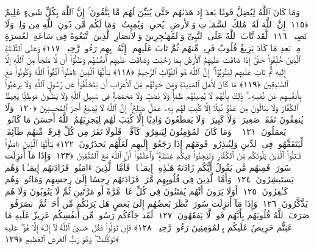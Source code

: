  وَمَا كَانَ ٱللَّهُ لِيُضِلَّ قَومًۢا بَعدَ إِذ هَدَىٰهُم حَتَّىٰ يُبَيِّنَ لَهُم مَّا يَتَّقُونَ ۚ إِنَّ ٱللَّهَ بِكُلِّ شَىءٍ عَلِيمٌ ﴿١١٥﴾
 إِنَّ ٱللَّهَ لَهُۥ مُلكُ ٱلسَّمَـٰوَٟتِ وَٱلأَرضِ ۖ يُحىِۦ وَيُمِيتُ ۚ وَمَا لَكُم مِّن دُونِ ٱللَّهِ مِن وَلِىٍّۢ وَلَا نَصِيرٍۢ ﴿١١٦﴾
 لَّقَد تَّابَ ٱللَّهُ عَلَى ٱلنَّبِىِّ وَٱلمُهَـٰجِرِينَ وَٱلأَنصَارِ ٱلَّذِينَ ٱتَّبَعُوهُ فِى سَاعَةِ ٱلعُسرَةِ مِنۢ بَعدِ مَا كَادَ يَزِيغُ قُلُوبُ فَرِيقٍۢ مِّنهُم ثُمَّ تَابَ عَلَيهِم ۚ إِنَّهُۥ بِهِم رَءُوفٌۭ رَّحِيمٌۭ ﴿١١٧﴾
 وَعَلَى ٱلثَّلَـٰثَةِ ٱلَّذِينَ خُلِّفُوا۟ حَتَّىٰٓ إِذَا ضَاقَت عَلَيهِمُ ٱلأَرضُ بِمَا رَحُبَت وَضَاقَت عَلَيهِم أَنفُسُهُم وَظَنُّوٓا۟ أَن لَّا مَلجَأَ مِنَ ٱللَّهِ إِلَّآ إِلَيهِ ثُمَّ تَابَ عَلَيهِم لِيَتُوبُوٓا۟ ۚ إِنَّ ٱللَّهَ هُوَ ٱلتَّوَّابُ ٱلرَّحِيمُ ﴿١١٨﴾
 يَـٰٓأَيُّهَا ٱلَّذِينَ ءَامَنُوا۟ ٱتَّقُوا۟ ٱللَّهَ وَكُونُوا۟ مَعَ ٱلصَّـٰدِقِينَ ﴿١١٩﴾
 مَا كَانَ لِأَهلِ ٱلمَدِينَةِ وَمَن حَولَهُم مِّنَ ٱلأَعرَابِ أَن يَتَخَلَّفُوا۟ عَن رَّسُولِ ٱللَّهِ وَلَا يَرغَبُوا۟ بِأَنفُسِهِم عَن نَّفسِهِۦ ۚ ذَٟلِكَ بِأَنَّهُم لَا يُصِيبُهُم ظَمَأٌۭ وَلَا نَصَبٌۭ وَلَا مَخمَصَةٌۭ فِى سَبِيلِ ٱللَّهِ وَلَا يَطَـُٔونَ مَوطِئًۭا يَغِيظُ ٱلكُفَّارَ وَلَا يَنَالُونَ مِن عَدُوٍّۢ نَّيلًا إِلَّا كُتِبَ لَهُم بِهِۦ عَمَلٌۭ صَـٰلِحٌ ۚ إِنَّ ٱللَّهَ لَا يُضِيعُ أَجرَ ٱلمُحسِنِينَ ﴿١٢٠﴾
 وَلَا يُنفِقُونَ نَفَقَةًۭ صَغِيرَةًۭ وَلَا كَبِيرَةًۭ وَلَا يَقطَعُونَ وَادِيًا إِلَّا كُتِبَ لَهُم لِيَجزِيَهُمُ ٱللَّهُ أَحسَنَ مَا كَانُوا۟ يَعمَلُونَ ﴿١٢١﴾
 ۞ وَمَا كَانَ ٱلمُؤمِنُونَ لِيَنفِرُوا۟ كَآفَّةًۭ ۚ فَلَولَا نَفَرَ مِن كُلِّ فِرقَةٍۢ مِّنهُم طَآئِفَةٌۭ لِّيَتَفَقَّهُوا۟ فِى ٱلدِّينِ وَلِيُنذِرُوا۟ قَومَهُم إِذَا رَجَعُوٓا۟ إِلَيهِم لَعَلَّهُم يَحذَرُونَ ﴿١٢٢﴾
 يَـٰٓأَيُّهَا ٱلَّذِينَ ءَامَنُوا۟ قَـٰتِلُوا۟ ٱلَّذِينَ يَلُونَكُم مِّنَ ٱلكُفَّارِ وَليَجِدُوا۟ فِيكُم غِلظَةًۭ ۚ وَٱعلَمُوٓا۟ أَنَّ ٱللَّهَ مَعَ ٱلمُتَّقِينَ ﴿١٢٣﴾
 وَإِذَا مَآ أُنزِلَت سُورَةٌۭ فَمِنهُم مَّن يَقُولُ أَيُّكُم زَادَتهُ هَـٰذِهِۦٓ إِيمَـٰنًۭا ۚ فَأَمَّا ٱلَّذِينَ ءَامَنُوا۟ فَزَادَتهُم إِيمَـٰنًۭا وَهُم يَستَبشِرُونَ ﴿١٢٤﴾
 وَأَمَّا ٱلَّذِينَ فِى قُلُوبِهِم مَّرَضٌۭ فَزَادَتهُم رِجسًا إِلَىٰ رِجسِهِم وَمَاتُوا۟ وَهُم كَـٰفِرُونَ ﴿١٢٥﴾
 أَوَلَا يَرَونَ أَنَّهُم يُفتَنُونَ فِى كُلِّ عَامٍۢ مَّرَّةً أَو مَرَّتَينِ ثُمَّ لَا يَتُوبُونَ وَلَا هُم يَذَّكَّرُونَ ﴿١٢٦﴾
 وَإِذَا مَآ أُنزِلَت سُورَةٌۭ نَّظَرَ بَعضُهُم إِلَىٰ بَعضٍ هَل يَرَىٰكُم مِّن أَحَدٍۢ ثُمَّ ٱنصَرَفُوا۟ ۚ صَرَفَ ٱللَّهُ قُلُوبَهُم بِأَنَّهُم قَومٌۭ لَّا يَفقَهُونَ ﴿١٢٧﴾
 لَقَد جَآءَكُم رَسُولٌۭ مِّن أَنفُسِكُم عَزِيزٌ عَلَيهِ مَا عَنِتُّم حَرِيصٌ عَلَيكُم بِٱلمُؤمِنِينَ رَءُوفٌۭ رَّحِيمٌۭ ﴿١٢٨﴾
 فَإِن تَوَلَّوا۟ فَقُل حَسبِىَ ٱللَّهُ لَآ إِلَـٰهَ إِلَّا هُوَ ۖ عَلَيهِ تَوَكَّلتُ ۖ وَهُوَ رَبُّ ٱلعَرشِ ٱلعَظِيمِ ﴿١٢٩﴾
 
